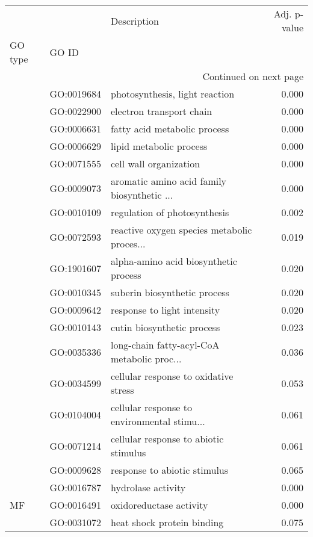 \begin{longtable}{lllr}
\toprule
   &            &                                  Description &  Adj. p-value \\
GO type & GO ID &                                              &               \\
\midrule
\endhead
\midrule
\multicolumn{4}{r}{{Continued on next page}} \\
\midrule
\endfoot

\bottomrule
\endlastfoot
\multirow{17}{*}{BP} & GO:0019684 &               photosynthesis, light reaction &         0.000 \\
   & GO:0022900 &                     electron transport chain &         0.000 \\
   & GO:0006631 &                 fatty acid metabolic process &         0.000 \\
   & GO:0006629 &                      lipid metabolic process &         0.000 \\
   & GO:0071555 &                       cell wall organization &         0.000 \\
   & GO:0009073 &  aromatic amino acid family biosynthetic ... &         0.000 \\
   & GO:0010109 &                 regulation of photosynthesis &         0.002 \\
   & GO:0072593 &  reactive oxygen species metabolic proces... &         0.019 \\
   & GO:1901607 &        alpha-amino acid biosynthetic process &         0.020 \\
   & GO:0010345 &                 suberin biosynthetic process &         0.020 \\
   & GO:0009642 &                  response to light intensity &         0.020 \\
   & GO:0010143 &                   cutin biosynthetic process &         0.023 \\
   & GO:0035336 &  long-chain fatty-acyl-CoA metabolic proc... &         0.036 \\
   & GO:0034599 &        cellular response to oxidative stress &         0.053 \\
   & GO:0104004 &  cellular response to environmental stimu... &         0.061 \\
   & GO:0071214 &        cellular response to abiotic stimulus &         0.061 \\
   & GO:0009628 &                 response to abiotic stimulus &         0.065 \\
\cline{1-4}
\multirow{3}{*}{MF} & GO:0016787 &                           hydrolase activity &         0.000 \\
   & GO:0016491 &                      oxidoreductase activity &         0.000 \\
   & GO:0031072 &                   heat shock protein binding &         0.075 \\
\end{longtable}
